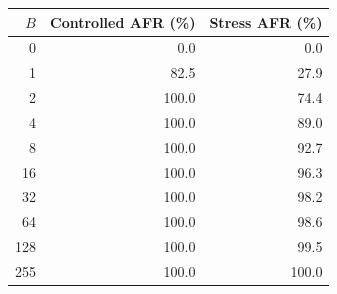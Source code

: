 \begin{tabular}{rrr}
\toprule
$B$ & \textbf{Controlled AFR (\%)} & \textbf{Stress AFR (\%)} \\
\midrule
0 & 0.0 & 0.0 \\
1 & 82.5 & 27.9 \\
2 & 100.0 & 74.4 \\
4 & 100.0 & 89.0 \\
8 & 100.0 & 92.7 \\
16 & 100.0 & 96.3 \\
32 & 100.0 & 98.2 \\
64 & 100.0 & 98.6 \\
128 & 100.0 & 99.5 \\
255 & 100.0 & 100.0 \\
\bottomrule
\end{tabular}
